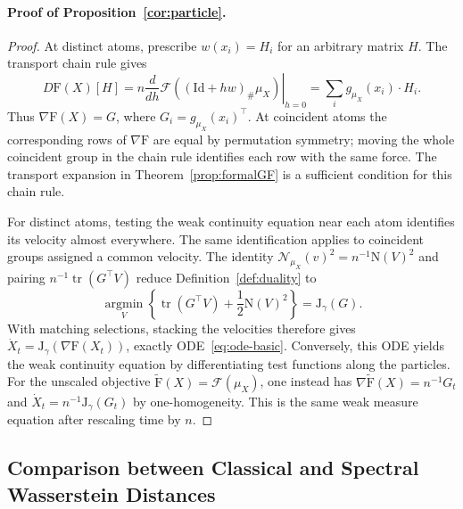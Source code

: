 \documentclass{article}
\newcommand{\mF}{\mathrm{F}}
\newcommand{\mN}{\mathrm{N}}
\newcommand{\mJ}{\mathrm{J}}
\newcommand{\MF}{\mathcal{F}}
\newcommand{\MN}{\mathcal{N}}
\newcommand{\tr}{\operatorname{tr}}
\newcommand{\Id}{\mathrm{Id}}
\begin{document}
\paragraph{Proof of Proposition~\ref{cor:particle}.}
\begin{proof}
At distinct atoms, prescribe $w(x_i)=H_i$ for an arbitrary matrix $H$.
The transport chain rule gives
\[
 D\mF(X)[H]
 =n\left.\frac{d}{dh}\MF((\Id+hw)_\#\mu_X)\right|_{h=0}
 =\sum_i g_{\mu_X}(x_i)\cdot H_i .
\]
Thus $\nabla\mF(X)=G$, where $G_i=g_{\mu_X}(x_i)^\top$.
At coincident atoms the corresponding rows of $\nabla\mF$ are equal
by permutation symmetry; moving the whole coincident group in the
chain rule identifies each row with the same force.
The transport expansion in Theorem~\ref{prop:formalGF} is a sufficient
condition for this chain rule.

For distinct atoms, testing the weak continuity equation near each atom
identifies its velocity almost everywhere. The same identification applies
to coincident groups assigned a common velocity.
The identity $\MN_{\mu_X}(v)^2=n^{-1}\mN(V)^2$ and pairing
$n^{-1}\tr(G^\top V)$ reduce Definition~\ref{def:duality} to
$$
\operatorname*{argmin}_V\left\{\tr(G^\top V)+\frac12\mN(V)^2\right\}=\mJ_\gamma(G).
$$
With matching selections, stacking the velocities therefore gives
$\dot X_t=\mJ_\gamma(\nabla\mF(X_t))$, exactly
ODE~\eqref{eq:ode-basic}. Conversely, this ODE yields the weak continuity
equation by differentiating test functions along the particles.
For the unscaled
objective $\widetilde{\mF}(X)=\MF(\mu_X)$, one instead has
$\nabla\widetilde{\mF}(X)=n^{-1}G_t$ and
$\dot X_t=n^{-1}\mJ_\gamma(G_t)$ by one-homogeneity. This is the same weak
measure equation after rescaling time by $n$.
\end{proof}

\subsection{Comparison between Classical and Spectral Wasserstein Distances}
\label{app:static-details}
\end{document}
